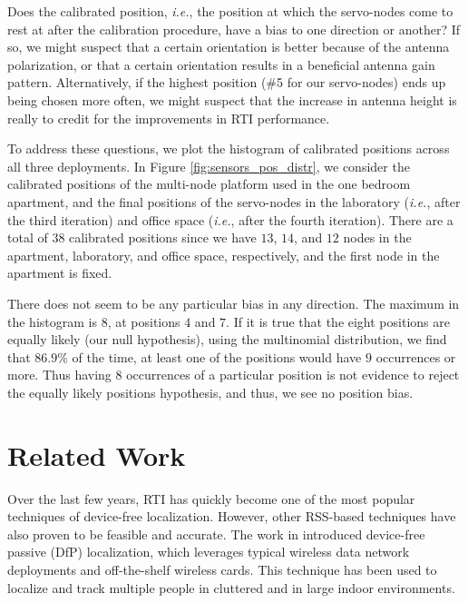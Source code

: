 \documentclass[conference]{IEEEtran}
\begin{document}
Does the calibrated position, \emph{i.e.}, the position at which the servo-nodes come to rest at after the calibration procedure, have a bias to one direction or another?  If so, we might suspect that a certain orientation is better because of the antenna polarization, or that a certain orientation results in a beneficial antenna gain pattern.  Alternatively, if the highest position (\#5 for our servo-nodes) ends up being chosen more often, we might suspect that the increase in antenna height is really to credit for the improvements in RTI performance. 

To address these questions, we plot the histogram of calibrated positions across all three deployments. In Figure \ref{fig:sensors_pos_distr}, we consider the calibrated positions of the multi-node platform used in the one bedroom apartment, and the final positions of the servo-nodes in the laboratory (\emph{i.e.}, after the third iteration) and office space (\emph{i.e.}, after the fourth iteration). There are a total of $38$ calibrated positions since we have $13$, $14$, and $12$ nodes in the apartment, laboratory, and office space, respectively, and the first node in the apartment is fixed.  

There does not seem to be any particular bias in any direction.  The maximum in the histogram is $8$, at positions $4$ and $7$.  If it is true that the eight positions are equally likely (our null hypothesis), using the multinomial distribution, we find that $86.9\%$ of the time, at least one of the positions would have $9$ occurrences or more.  Thus having $8$ occurrences of a particular position is not evidence to reject the equally likely positions hypothesis, and thus, we see no position bias.







\section{Related Work}
\label{sec:related_work}

Over the last few years, RTI has quickly become one of the most popular techniques of device-free localization. However, other RSS-based techniques have also proven to be feasible and accurate. The work in \cite{youssef07} introduced device-free passive (DfP) localization, which leverages typical wireless data network deployments and off-the-shelf wireless cards. This technique has been used to localize and track multiple people in cluttered \cite{SPOT_Youssef} and in large \cite{Nuzzer_Youssef} indoor environments.
\end{document}
